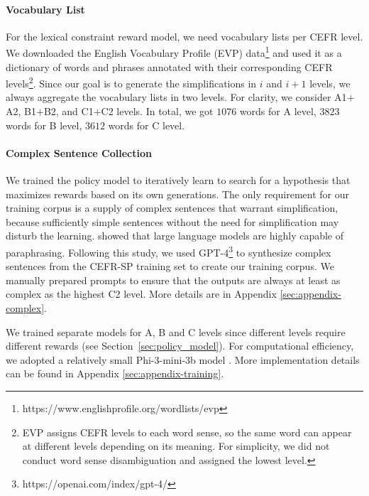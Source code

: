 \paragraph{Vocabulary List}
For the lexical constraint reward model, we need vocabulary lists per CEFR level. 
We downloaded the English Vocabulary Profile (EVP) data\footnote{https://www.englishprofile.org/wordlists/evp} and used it as a dictionary of words and phrases annotated with their corresponding CEFR levels\footnote{EVP assigns CEFR levels to each word sense, so the same word can appear at different levels depending on its meaning. For simplicity, we did not conduct word sense disambiguation and assigned the lowest level.}.
Since our goal is to generate the simplifications in $i$ and $i+1$ levels, we always aggregate the vocabulary lists in two levels. For clarity, we consider A1$+$A2, B1$+$B2, and C1$+$C2 levels. In total, we got $1076$ words for A level, $3823$ words for B level, $3612$ words for C level. 

\paragraph{Complex Sentence Collection}
We trained the policy model to iteratively learn to search for a hypothesis that maximizes rewards based on its own generations. 
The only requirement for our training corpus is a supply of complex sentences that warrant simplification, because sufficiently simple sentences without the need for simplification may disturb the learning. 
\citet{cegin-etal-2023-chatgpt} showed that large language models are highly capable of paraphrasing. 
Following this study, we used GPT-4\footnote{https://openai.com/index/gpt-4/} to synthesize complex sentences from the CEFR-SP training set to create our training corpus. 
We manually prepared prompts to ensure that the outputs are always at least as complex as the highest C2 level. 
More details are in Appendix \ref{sec:appendix-complex}.

We trained separate models for A, B and C levels since different levels require different rewards (see Section~\ref{sec:policy_model}). 
For computational efficiency, we adopted a relatively small Phi-3-mini-3b model \cite{abdin2024phi}. 
More implementation details can be found in Appendix \ref{sec:appendix-training}.



